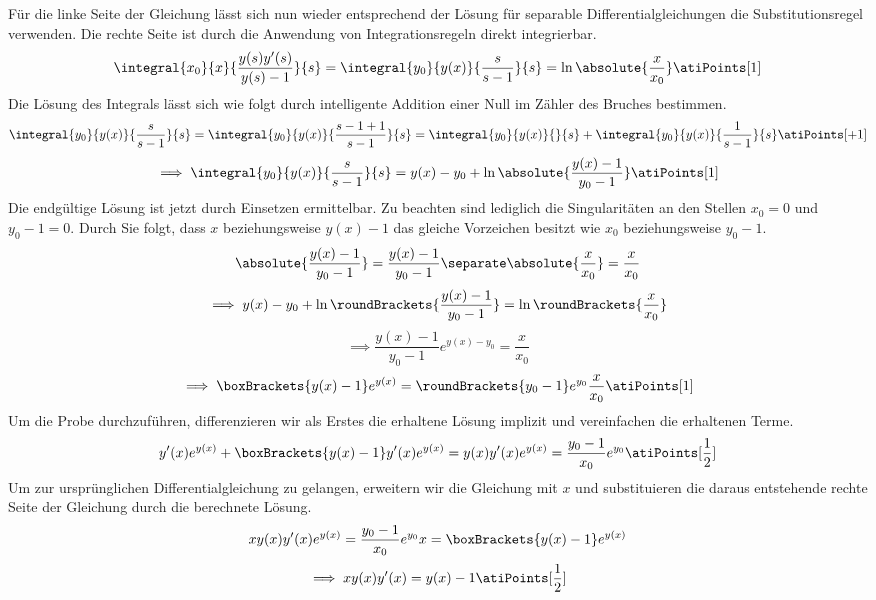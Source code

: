 \begin{atiSolution}
\begin{atiSubtaskSolutions}
{\[			\]
			Für die linke Seite der Gleichung lässt sich nun wieder entsprechend der Lösung für separable Differentialgleichungen die Substitutionsregel verwenden.
			Die rechte Seite ist durch die Anwendung von Integrationsregeln direkt integrierbar.
			\[
				\integral{x_0}{x}{\frac{y(s)y'(s)}{y(s)-1}}{s} = \integral{y_0}{y(x)}{\frac{s}{s-1}}{s} = \ln\absolute{\frac{x}{x_0}}\atiPoints[1]
			\]
			Die Lösung des Integrals lässt sich wie folgt durch intelligente Addition einer Null im Zähler des Bruches bestimmen.
			\[
				\integral{y_0}{y(x)}{\frac{s}{s-1}}{s} = \integral{y_0}{y(x)}{\frac{s-1+1}{s-1}}{s} = \integral{y_0}{y(x)}{}{s} + \integral{y_0}{y(x)}{\frac{1}{s-1}}{s}\atiPoints[+1]
			\]
			\[
				\implies \integral{y_0}{y(x)}{\frac{s}{s-1}}{s} = y(x)-y_0 + \ln\absolute{\frac{y(x)-1}{y_0-1}} \atiPoints[1]
			\]
			Die endgültige Lösung ist jetzt durch Einsetzen ermittelbar.
			Zu beachten sind lediglich die Singularitäten an den Stellen $x_0 = 0$ und $y_0 - 1 = 0$.
			Durch Sie folgt, dass $x$ beziehungsweise $y(x)-1$ das gleiche Vorzeichen besitzt wie $x_0$ beziehungsweise $y_0-1$.
			\[
				\absolute{\frac{y(x)-1}{y_0-1}}=\frac{y(x)-1}{y_0-1}\separate \absolute{\frac{x}{x_0}} = \frac{x}{x_0}
			\]
			\[
				\implies y(x)-y_0 + \ln\roundBrackets{\frac{y(x)-1}{y_0-1}} = \ln\roundBrackets{\frac{x}{x_0}}
			\]
			\[
				\implies \frac{y(x)-1}{y_0-1}e^{y(x)-y_0} = \frac{x}{x_0}
			\]
			\[
				\implies \boxBrackets{y(x)-1}e^{y(x)} = \roundBrackets{y_0-1}e^{y_0}\frac{x}{x_0}\atiPoints[1]
			\]
			Um die Probe durchzuführen, differenzieren wir als Erstes die erhaltene Lösung implizit und vereinfachen die erhaltenen Terme.
			\[
				y'(x)e^{y(x)} + \boxBrackets{y(x)-1}y'(x)e^{y(x)} = y(x)y'(x)e^{y(x)} = \frac{y_0-1}{x_0}e^{y_0}\atiPoints[\frac{1}{2}]
			\]
			Um zur ursprünglichen Differentialgleichung zu gelangen, erweitern wir die Gleichung mit $x$ und substituieren die daraus entstehende rechte Seite der Gleichung durch die berechnete Lösung.
			\[
				x y(x) y'(x)e^{y(x)} = \frac{y_0-1}{x_0}e^{y_0}x = \boxBrackets{y(x)-1}e^{y(x)}
			\]
			\[
				\implies x y(x) y'(x) = y(x)-1\atiPoints[\frac{1}{2}]
			\]
		}
	\end{atiSubtaskSolutions}
\end{atiSolution}